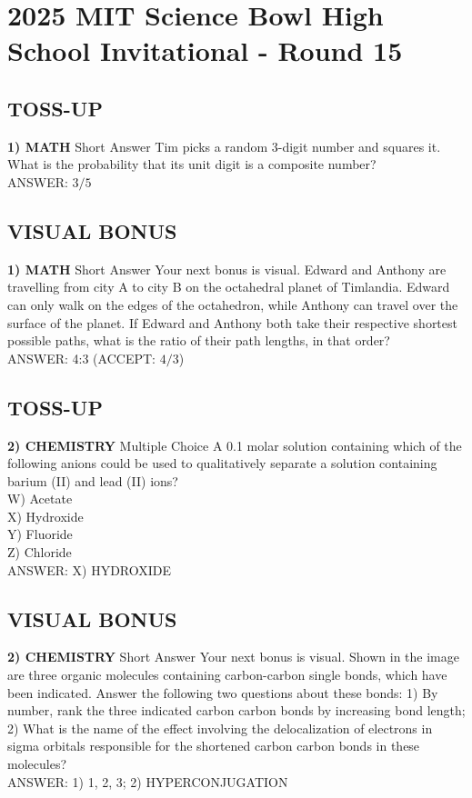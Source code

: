 \documentclass{article}
\begin{document}
\section*{2025 MIT Science Bowl High School Invitational - Round 15}

\subsection*{TOSS-UP}
\textbf{1) MATH} Short Answer Tim picks a random 3-digit number and squares it. What is the probability that its unit digit is a composite number?
\\ANSWER: $3/5$

\subsection*{VISUAL BONUS}
\textbf{1) MATH} Short Answer Your next bonus is visual. Edward and Anthony are travelling from city A to city B on the octahedral planet of Timlandia. Edward can only walk on the edges of the octahedron, while Anthony can travel over the surface of the planet. If Edward and Anthony both take their respective shortest possible paths, what is the ratio of their path lengths, in that order?
\\ANSWER: 4:3 (ACCEPT: $4/3$)

\subsection*{TOSS-UP}
\textbf{2) CHEMISTRY} Multiple Choice A 0.1 molar solution containing which of the following anions could be used to qualitatively separate a solution containing barium (II) and lead (II) ions?
\\W) Acetate
\\X) Hydroxide
\\Y) Fluoride
\\Z) Chloride
\\ANSWER: X) HYDROXIDE

\subsection*{VISUAL BONUS}
\textbf{2) CHEMISTRY} Short Answer Your next bonus is visual. Shown in the image are three organic molecules containing carbon-carbon single bonds, which have been indicated. Answer the following two questions about these bonds: 1) By number, rank the three indicated carbon carbon bonds by increasing bond length; 2) What is the name of the effect involving the delocalization of electrons in sigma orbitals responsible for the shortened carbon carbon bonds in these molecules?
\\ANSWER: 1) 1, 2, 3; 2) HYPERCONJUGATION
\end{document}
